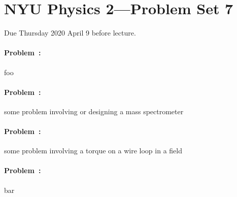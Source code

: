 \documentclass[12pt]{article}
\begin{document}
\section*{NYU Physics 2---Problem Set 7}

Due Thursday 2020 April 9 before lecture.

\paragraph{Problem~\theproblem:}%
foo

\paragraph{Problem~\theproblem:}%
some problem involving or designing a mass spectrometer

\paragraph{Problem~\theproblem:}%
some problem involving a torque on a wire loop in a field

\paragraph{Problem~\theproblem:}%
bar
\end{document}
